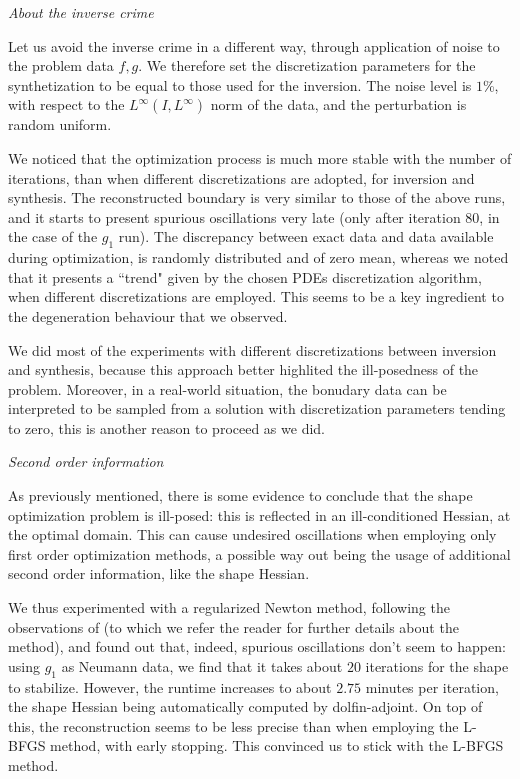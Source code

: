 \documentclass[english,a4paper,10pt,oneside]{scrbook}	%
\theoremstyle{break}
\theoremstyle{remark}
\begin{document}
\textit{About the inverse crime}

Let us avoid the inverse crime in a different way, through application of noise to the problem data $f,g$. We therefore set the discretization parameters for the synthetization to be equal to those used for the inversion. The noise level is $1$\%, with respect to the $L^\infty(I,L^\infty)$ norm of the data, and the perturbation is random uniform. 

We noticed that the optimization process is much more stable with the number of iterations, than when different discretizations are adopted, for inversion and synthesis. The reconstructed boundary is very similar to those of the above runs, and it starts to present spurious oscillations  very late (only after iteration $80$, in the case of the $g_1$ run). The discrepancy between exact data and data available during optimization, is randomly distributed and of zero mean, whereas we noted that it presents a ``trend" given by the chosen PDEs discretization algorithm, when different discretizations are employed. This seems to be a key ingredient to the degeneration behaviour that we observed. 

We did most of the experiments with different discretizations between inversion and synthesis, because this approach better highlited the ill-posedness of the problem. Moreover, in a real-world situation, the bonudary data can be interpreted to be sampled from a solution with discretization parameters tending to zero, this is another reason to proceed as we did.

\textit{Second order information}

As previously mentioned, there is some evidence to conclude that the shape optimization problem is ill-posed: this is reflected in an ill-conditioned Hessian, at the optimal domain. This can cause undesired oscillations when employing only first order optimization methods, a possible way out being the usage of additional second order information, like the shape Hessian.

We thus experimented with a regularized Newton method, following the observations of \cite{eppler} (to which we refer the reader for further details about the method), and found out that, indeed, spurious oscillations don't seem to happen: using $g_1$ as Neumann data, we find that it takes about $20$ iterations for the shape to stabilize. However, the runtime increases to about $2.75$ minutes per iteration, the shape Hessian being automatically computed by dolfin-adjoint. On top of this, the reconstruction seems to be less precise than when employing the L-BFGS method, with early stopping. This convinced us to stick with the L-BFGS method. 
\end{document}
